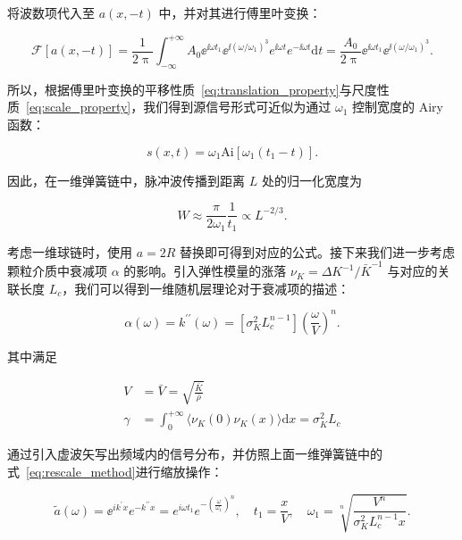 将波数项代入至 $a(x,-t)$ 中，并对其进行傅里叶变换：

\begin{equation}
  \mathcal{F}[a(x,-t)] = \frac{1}{2\uppi}\int_{-\infty}^{+\infty}A_{0}{\ee}^{\ii\omega t_{1}}{\ee}^{\ii(\omega/\omega_{1})^{3}}e^{\ii\omega t}e^{-\ii\omega t}\mathrm{d}t = \frac{A_{0}}{2\uppi}{\ee}^{\ii\omega t_{1}}{\ee}^{\ii(\omega/\omega_{1})^{3}}.
\end{equation}

所以，根据傅里叶变换的平移性质~\eqref{eq:translation_property}与尺度性质~\eqref{eq:scale_property}，我们得到源信号形式可近似为通过 $\omega_{1}$ 控制宽度的 Airy 函数：

\begin{equation}
  s(x,t) = \omega_{1}\text{Ai}\left[\omega_{1}(t_{1}-t)\right].
\end{equation}

因此，在一维弹簧链中，脉冲波传播到距离 $L$ 处的归一化宽度为

\begin{equation}
  W \approx \frac{\pi}{2\omega_{1}}\frac{1}{t_{1}}\propto L^{-2/3}.
\end{equation}

考虑一维球链时，使用 $a=2R$ 替换即可得到对应的公式\cite{PhysRevE.91.022205}。接下来我们进一步考虑颗粒介质中衰减项 $\alpha$ 的影响。引入弹性模量的涨落 $\nu_{K} = \Delta K^{-1}/\bar{K}^{-1}$ 与对应的关联长度 $L_{c}$，我们可以得到一维随机层理论对于衰减项的描述：

\begin{equation}
  \alpha(\omega) = k^{\prime\prime}(\omega) = [\sigma_{K}^{2}L_{c}^{n-1}]\left(\frac{\omega}{V}\right)^{n}.
\end{equation}

其中满足

\begin{align}
  V &= \bar{V} = \sqrt{\frac{\bar{K}}{\bar{\rho}}}\\
  \gamma &= \int_{0}^{+\infty}\langle\nu_{K}(0)\nu_{K}(x)\rangle\mathrm{d}x = \sigma_{K}^{2}L_{c}
\end{align}

通过引入虚波矢写出频域内的信号分布，并仿照上面一维弹簧链中的式~\eqref{eq:rescale_method}进行缩放操作：

\begin{equation}
  \widetilde{a}(\omega) = {\ee}^{ik^{\prime}x}e^{-k^{\prime\prime}x} = e^{i\omega t_{1}}e^{-\left(\frac{\omega}{\omega_{1}}\right)^{n}},\quad t_{1} = \frac{x}{V},\quad \omega_{1} = \sqrt[n]{\frac{V^{n}}{\sigma_{K}^{2}L_{c}^{n-1}x}}.
\end{equation}

